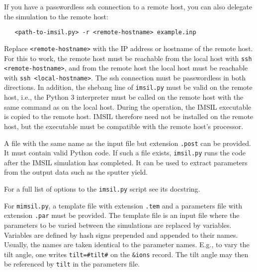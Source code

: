 If you have a passwordless ssh connection to a remote host, you can also
delegate the simulation to the remote host:
%
\begin{verbatim}
   <path-to-imsil.py> -r <remote-hostname> example.inp
\end{verbatim}
%
Replace \texttt{<remote-hostname>} with the IP address or hostname of the
remote host. For this to work, the remote host must be reachable from the local
host with \texttt{ssh <remote-hostname>}, and from the remote host the local
host must be reachable with \texttt{ssh <local-hostname>}. The ssh connection
must be passwordless in both directions. In addition, the shebang line of
\texttt{imsil.py} must be valid on the remote host, i.e., the Python 3
interpreter must be called on the remote host with the same command as on the
local host. During the operation, the IMSIL executable is copied to the remote
host. IMSIL therefore need not be installed on the remote host, but the
executable must be compatible with the remote host's processor.

A file with the same name as the input file but extension \texttt{.post} can
be provided. It must contain valid Python code. If such a file exists,
\texttt{imsil.py} runs the code after the IMSIL simulation has completed.
It can be used to extract parameters from the output data such as the sputter
yield. 

For a full list of options to the \texttt{imsil.py} script see its docstring.

For \texttt{mimsil.py}, a template file with extension \texttt{.tem} and a
parameters file with extension \texttt{.par} must be provided. The template file
is an input file where the parameters to be varied between the simulations are 
replaced by variables. Variables are defined by hash signs prepended and
appended to their names. Usually, the names are taken identical to the parameter 
names. E.g., to vary the tilt angle, one writes \texttt{tilt=\#tilt\#} on the
\texttt{\&ions} record. The tilt angle may then be referenced by \texttt{tilt}
in the parameters file.

